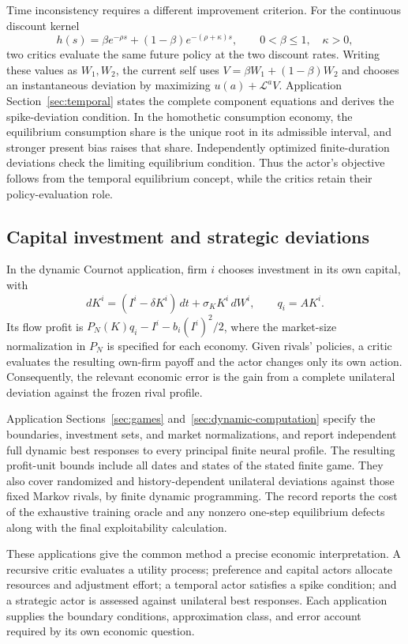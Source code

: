 \documentclass[ecta,nameyear,draft]{econsocart}
\theoremstyle{definition}
\theoremstyle{remark}
\newcommand{\LL}{\mathcal L}
\begin{document}
Time inconsistency requires a different improvement criterion. For the continuous discount kernel
\[
 h(s)=\beta e^{-\rho s}+(1-\beta)e^{-(\rho+\kappa)s},
 \qquad 0<\beta\leq1,\quad\kappa>0,
\]
two critics evaluate the same future policy at the two discount rates. Writing these values as $W_1,W_2$, the current self uses $V=\beta W_1+(1-\beta)W_2$ and chooses an instantaneous deviation by maximizing $u(a)+\LL^a V$. Application Section~\ref{sec:temporal} states the complete component equations and derives the spike-deviation condition. In the homothetic consumption economy, the equilibrium consumption share is the unique root in its admissible interval, and stronger present bias raises that share. Independently optimized finite-duration deviations check the limiting equilibrium condition. Thus the actor's objective follows from the temporal equilibrium concept, while the critics retain their policy-evaluation role.

\subsection{Capital investment and strategic deviations}
In the dynamic Cournot application, firm $i$ chooses investment in its own capital, with
\[
 dK^i=(I^i-\delta K^i)\,dt+\sigma_KK^i\,dW^i,
 \qquad q_i=AK^i.
\]
Its flow profit is $P_N(K)q_i-I^i-b_i(I^i)^2/2$, where the market-size normalization in $P_N$ is specified for each economy. Given rivals' policies, a critic evaluates the resulting own-firm payoff and the actor changes only its own action. Consequently, the relevant economic error is the gain from a complete unilateral deviation against the frozen rival profile.

Application Sections~\ref{sec:games} and~\ref{sec:dynamic-computation} specify the boundaries, investment sets, and market normalizations, and report independent full dynamic best responses to every principal finite neural profile. The resulting profit-unit bounds include all dates and states of the stated finite game. They also cover randomized and history-dependent unilateral deviations against those fixed Markov rivals, by finite dynamic programming. The record reports the cost of the exhaustive training oracle and any nonzero one-step equilibrium defects along with the final exploitability calculation.

These applications give the common method a precise economic interpretation. A recursive critic evaluates a utility process; preference and capital actors allocate resources and adjustment effort; a temporal actor satisfies a spike condition; and a strategic actor is assessed against unilateral best responses. Each application supplies the boundary conditions, approximation class, and error account required by its own economic question.
\end{document}
